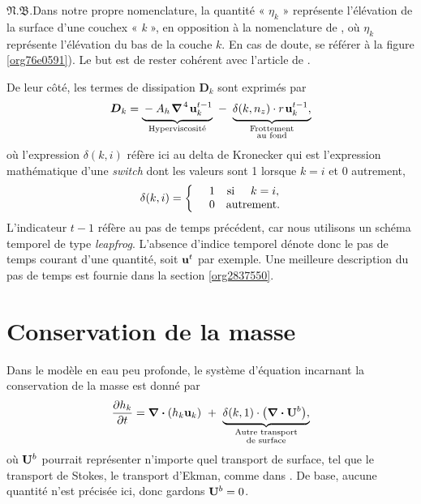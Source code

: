 \documentclass[10pt]{report}
\numberwithin{equation}{section}
\newcommand{\uu}{\vb{u}}
\newcommand{\tall}{\vphantom{A^{x^x}_p}}
\newcommand{\pt}{\hspace{1pt}} %
\newcommand{\nb}{\underline{{\footnotesize\EightStarConvex}\pt $\mathfrak{N.B.}$\vphantom{p}}\hspace{3pt}}
\begin{document}
\nb Dans notre propre nomenclature, la quantité « \(\eta_k\) » représente l'élévation de la surface d'une couchex « \emph{k} », en opposition à la nomenclature de \Textcite{vallis_2006}, où \(\eta_k\) représente l'élévation du bas de la couche \(k\).
En cas de doute, se référer à la figure \ref{org76e0591}).
Le but est de rester cohérent avec l'article de \textcite{chen_2021}.
\bigskip

De leur côté, les termes de dissipation \(\boldsymbol{D}_k\) sont exprimés par
\begin{equation}
   \boldsymbol{D}_k = \underbrace{\tall-A_h\pt\gradient^{\pt4}\pt\uu^{t-1}_k}_\text{Hyperviscosité}
   \ - \ \underbrace{\tall\delta(k,n_z) \cdot r\pt \uu^{t-1}_k,}_{\substack{\text{Frottement}\\\text{au fond}}}
\end{equation}
où l'expression \(\delta(k,i)\) réfère ici au delta de Kronecker qui est l'expression mathématique d'une \emph{switch} dont les valeurs sont 1 lorsque \(k=i\) et 0 autrement,
\begin{equation}
   \delta(k,i) = \left\lbrace \hspace{0.2cm}\begin{matrix}
     \hspace{0.3cm}1 & \text{si}\hspace{0.5cm} k=i, \\
     \hspace{0.3cm}0 & \text{autrement}.
   \end{matrix}\right.
\end{equation}
L'indicateur \(t-1\) réfère au pas de temps précédent, car nous utilisons un schéma temporel de type \emph{leapfrog}.
L'absence d'indice temporel dénote donc le pas de temps courant d'une quantité, soit \(\uu^t\) par exemple. 
Une meilleure description du pas de temps est fournie dans la section \ref{org2837550}. \bigskip

\section{Conservation de la masse}
\label{sec:org12f6bc1}

Dans le modèle en eau peu profonde, le système d'équation incarnant la conservation de la masse est donné par
\begin{equation}
   \pdv{h_k}{t} =  \divergence(h_k\uu_k)\ +\ \underbrace{\delta(k,1)\cdot \qty(\divergence{\vb{U}^b}),}_{\substack{\text{Autre transport}\\ \text{de surface}}}
\end{equation}
où \(\vb{U}^b\) pourrait représenter n'importe quel transport de surface, tel que le transport de Stokes, le transport d'Ekman, comme dans \Textcite{chen_2021}.
De base, aucune quantité n'est précisée ici, donc gardons \(\vb{U}^b = 0\). 
\end{document}
